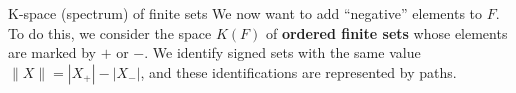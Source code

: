 \documentclass[12pt]{beamer}
\begin{document}
\begin{frame}{K-space (spectrum) of finite sets}
  We now want to add “negative” elements to $F$. To do this, we consider the space $K(F)$ of \textbf{ordered finite sets} whose elements are marked by $+$ or $-$. We identify signed sets with the same value $\|X\| = |X_+|-|X_-|$, and these identifications are represented by paths.
\pause
\begin{center}

  


\begin{tikzpicture}[x=0.75pt,y=0.75pt,yscale=-1,xscale=1]


\end{tikzpicture}
\end{center}
\end{frame}
\end{document}

